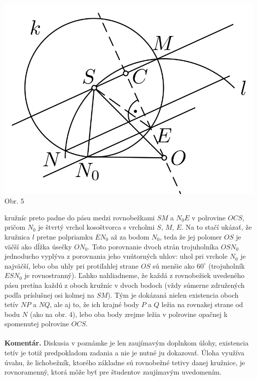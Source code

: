 \documentclass[11pt,a4paper,oneside,final]{book}
\newcommand{\kom}{\textbf{Komentár.} }
\begin{document}
\begin{center}
\includegraphics[scale=0.3]{59K32}\\

Obr. 5
\end{center}
kružníc preto padne do pásu medzi rovnobežkami $SM$ a $N_0 E$ v polrovine $OCS$, pričom $N_0$ je štvrtý vrchol kosoštvorca s vrcholmi $S$, $M$, $E$. Na to stačí ukázať, že kružnica $l$ pretne polpriamku $EN_0$ až za bodom $N_0$, teda že jej polomer $OS$ je väčší ako dĺžka úsečky $ON_0$. Toto porovnanie dvoch strán trojuholníka $OSN_0$ jednoducho vyplýva z porovnania jeho vnútorných uhlov: uhol pri vrchole $N_0$ je najväčší, lebo oba uhly pri protiľahlej strane $OS$ sú menšie ako $60^\circ$ (trojuholník $ESN_0$ je rovnostranný). Ľahko nahliadneme, že každá z rovnobežiek uvedeného pásu pretína každú z oboch kružníc v dvoch bodoch (vždy súmerne združených podľa príslušnej osi kolmej na $SM$). Tým je dokázaná nielen existencia oboch tetív $NP$ a $NQ$, ale aj to, že ich krajné body $P$ a $Q$ ležia na rovnakej strane od bodu $N$ (ako na obr. 4), lebo oba body zrejme ležia v polrovine opačnej k spomenutej polrovine $OCS$.\\
\\
\kom Diskusia v poznámke je len zaujímavým doplnkom úlohy, existencia tetív je totiž predpokladom zadania a nie je nutné ju dokazovať. Úloha využíva úvahu, že lichobežník, ktorého základne sú rovnobežné tetivy danej kružnice, je rovnoramenný, ktorá môže byť pre študentov zaujímavým uvedomením.\\
\\
\end{document}
